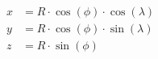 \documentclass[preview]{standalone}
\begin{document}
\begin{align*}
x &= R \cdot \cos(\phi) \cdot \cos(\lambda) \\y &= R \cdot \cos(\phi) \cdot \sin(\lambda) \\z &= R \cdot \sin(\phi)
\end{align*}
\end{document}
